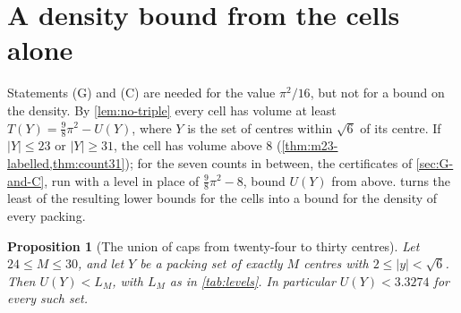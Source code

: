 \documentclass[11pt,reqno]{amsart}
\renewcommand{\_}{\origunderscore\allowbreak}
\numberwithin{equation}{section}
\theoremstyle{plain}
\newtheorem{prop}[thm]{Proposition}
\theoremstyle{definition}
\theoremstyle{remark}
\begin{document}






\section{A density bound from the cells alone}\label{sec:density-cells}

Statements (G) and (C) are needed for the value $\pi^2/16$, but not for a
bound on the density. By \cref{lem:no-triple} every cell has volume at least
$T(Y)=\frac98\pi^2-U(Y)$, where $Y$ is the set of centres within $\sqrt6$ of
its centre. If $|Y|\le23$ or $|Y|\ge31$, the cell has volume above $8$
(\cref{thm:m23-labelled,thm:count31}); for the seven counts in between, the
certificates of \cref{sec:G-and-C}, run with a level in place of
$\frac98\pi^2-8$, bound $U(Y)$ from above.  turns the
least of the resulting lower bounds for the cells into a bound for the
density of every packing.

\begin{prop}[The union of caps from twenty-four to thirty centres]\label{prop:levels}
Let $24\le M\le30$, and let $Y$ be a packing set of exactly $M$ centres with
$2\le|y|<\sqrt6$. Then $U(Y)<L_M$, with $L_M$ as in \cref{tab:levels}. In
particular $U(Y)<3.3274$ for every such set.
\end{prop}
\end{document}
